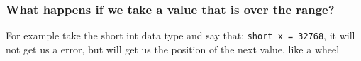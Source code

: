             \subsubsection{What happens if we take a value that is over the range?}
                For example take the short int data type and say that: \texttt{short x = 32768}, it will not get us a error, but will get us the position of the next value, like a wheel \\ \\

        \section{}
            
        
        




